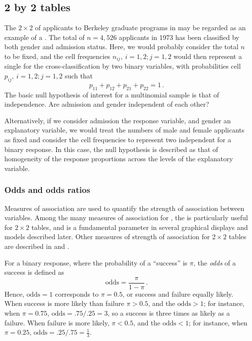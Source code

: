 \subsection{2 by 2 tables}\label{sec:twoway-twobytwo}

The $2 \times 2$ \ctab{} of applicants to Berkeley graduate programs in  may be regarded as an example of a
.
The total of $n = 4,526$ applicants in 1973 has been classified by both
gender and admission status.
Here, we would probably consider the total $n$ to be fixed,
and the cell frequencies $n_{ij},  \: i=1,2; j=1,2$
would then represent a single
 for the cross-classification by two
binary variables,
with probabilities cell $p_{ij},  \: i=1,2; j=1,2$
such that
\begin{equation*}
 p_{11} + p_{12} + p_{21} + p_{22} = 1
 \period
\end{equation*}
The basic null hypothesis of interest for a multinomial sample is that
of independence.  Are admission and gender independent of each other?

Alternatively, if we consider admission the response variable, and
gender an explanatory variable, we would treat the numbers of male
and female applicants as fixed
and consider the cell frequencies to represent two independent
 for a binary response.
In this case, the null hypothesis is described as that of homogeneity
of the response proportions across the levels of the explanatory variable.

\subsubsection{Odds and odds ratios}\label{sec:twoway-odds}
Measures of association are used to quantify the strength of association
between variables.  Among the many measures of association for
\ctabs, the  is particularly useful for
$2 \times 2$ tables, and is a fundamental parameter in several
graphical displays and models described later.
Other measures of strength of association for $2 \times 2$ tables
are described in  and \citet[{}\S 2.2]{Agresti:96}.

For a binary response, where the probability of a ``success'' is $\pi$,
the \emph{odds} of a success is defined as
\begin{equation*}
 \textrm{odds} = \frac{\pi}{1-\pi} \period
\end{equation*}
Hence, $\textrm{odds} = 1$ corresponds to $\pi = 0.5$, or success and
failure equally likely.   When success is more likely than failure
$\pi > 0.5$, and the $\textrm{odds} > 1$;  for instance, when $\pi = 0.75$,
$\textrm{odds} = .75/.25 =3$, so a success is three times as likely
as a failure.  When failure is more likely, $\pi < 0.5$, and the $\textrm{odds} < 1$;  for instance, when $\pi = 0.25$,
$\textrm{odds} = .25/.75 =\frac{1}{3}$.


